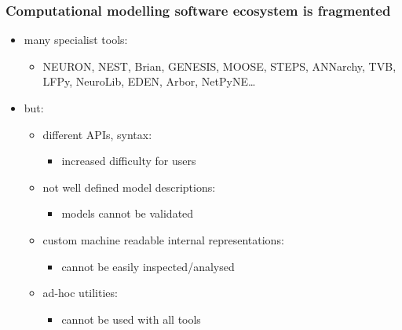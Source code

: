 \begin{frame}[c]
  \frametitle{Computational modelling software ecosystem is fragmented}
  \begin{itemize}
    \item many specialist tools:
      \begin{itemize}
        \item NEURON, NEST, Brian, GENESIS, MOOSE, STEPS, ANNarchy, TVB, LFPy, NeuroLib, EDEN, Arbor, NetPyNE\ldots{}
      \end{itemize}
    \item<2-> but:
      \begin{itemize}
        \item<2-> different APIs, syntax:
          \begin{itemize}
            \item<2-> increased difficulty for users
          \end{itemize}
        \item<3-> not well defined model descriptions:
          \begin{itemize}
            \item<3-> models cannot be validated
          \end{itemize}
        \item<4-> custom machine readable internal representations:
          \begin{itemize}
            \item<4-> cannot be easily inspected/analysed
          \end{itemize}
        \item<5-> ad-hoc utilities:
          \begin{itemize}
            \item<5->  cannot be used with all tools
          \end{itemize}
      \end{itemize}
  \end{itemize}
\end{frame}
